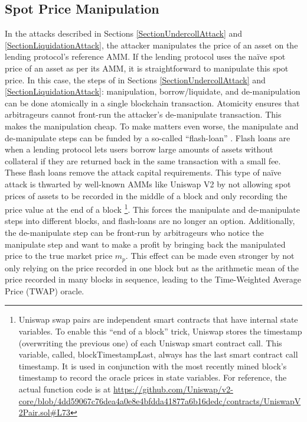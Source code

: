 \subsection{Spot Price Manipulation}
In the attacks described in Sections \ref{SectionUndercollAttack} and \ref{SectionLiquidationAttack}, the attacker manipulates the price of an asset on the lending protocol's reference AMM. If the lending protocol uses the na\"ive spot price of an asset as per its AMM, it is straightforward to manipulate this spot price. In this case, the steps of in Sections \ref{SectionUndercollAttack} and \ref{SectionLiquidationAttack}: manipulation, borrow/liquidate, and de-manipulation can be done atomically in a single blockchain transaction. Atomicity ensures that arbitrageurs cannot front-run the attacker's de-manipulate transaction. This makes the manipulation cheap. To make matters even worse, the manipulate and de-manipulate steps can be funded by a so-called ``flash-loan'' \cite{qin2021attacking}. Flash loans are when a lending protocol lets users borrow large amounts of assets without collateral if they are returned back in the same transaction with a small fee. These flash loans remove the attack capital requirements. This type of na\"ive attack is thwarted by well-known AMMs like Uniswap V2 \cite{Adams2020UniV2} by not allowing spot prices of assets to be recorded in the middle of a block and only recording the price value at the end of a block \footnote{Uniswap swap pairs are independent smart contracts that have internal state variables. To enable this ``end of a block'' trick, Uniswap stores the timestamp (overwriting the previous one) of each Uniswap smart contract call. This variable, called, blockTimestampLast, always has the last smart contract call timestamp. It is used in conjunction with the most recently mined block's timestamp to record the oracle prices in state variables. For reference, the actual function code is at \url{https://github.com/Uniswap/v2-core/blob/4dd59067c76dea4a0e8e4bfdda41877a6b16dedc/contracts/UniswapV2Pair.sol#L73}}. This forces the manipulate and de-manipulate steps into different blocks, and flash-loans are no longer an option. Additionally, the de-manipulate step can be front-run by arbitrageurs who notice the manipulate step and want to make a profit by bringing back the manipulated price to the true market price $m_p$. This effect can be made even stronger by not only relying on the price recorded in one block but as the arithmetic mean of the price recorded in many blocks in sequence, leading to the Time-Weighted Average Price (TWAP) oracle.

